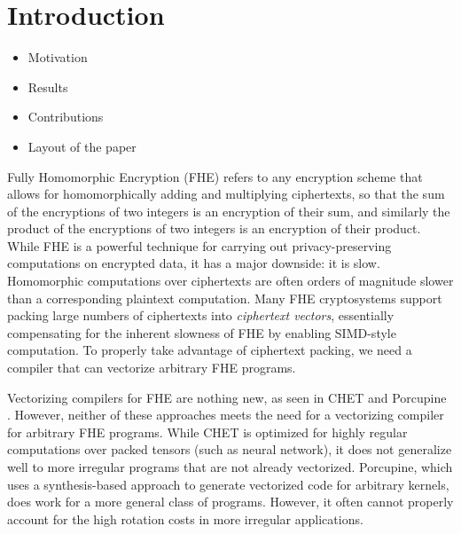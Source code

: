\section{Introduction}\label{sec:intro}
\begin{itemize}
    \item Motivation
    \item Results
    \item Contributions
    \item Layout of the paper
\end{itemize}

Fully Homomorphic Encryption (FHE) refers to any encryption scheme that allows for homomorphically adding and multiplying ciphertexts, so that the sum of the encryptions of two integers is an encryption of their sum, and similarly the product of the encryptions of two integers is an encryption of their product.
While FHE is a powerful technique for carrying out privacy-preserving computations on encrypted data, it has a major downside: it is slow.
Homomorphic computations over ciphertexts are often orders of magnitude slower than a corresponding plaintext computation.
Many FHE cryptosystems support packing large numbers of ciphertexts into {\em ciphertext vectors}, essentially compensating for the inherent slowness of FHE by enabling SIMD-style computation.
To properly take advantage of ciphertext packing, we need a compiler that can vectorize arbitrary FHE programs.

Vectorizing compilers for FHE are nothing new, as seen in CHET and Porcupine \cite{CHET, Porcupine}.
However, neither of these approaches meets the need for a vectorizing compiler for arbitrary FHE programs.
While CHET is optimized for highly regular computations over packed tensors (such as neural network), it does not generalize well to more irregular programs that are not already vectorized. 
Porcupine, which uses a synthesis-based approach to generate vectorized code for arbitrary kernels, does work for a more general class of programs.
However, it often cannot properly account for the high rotation costs in more irregular applications. 

